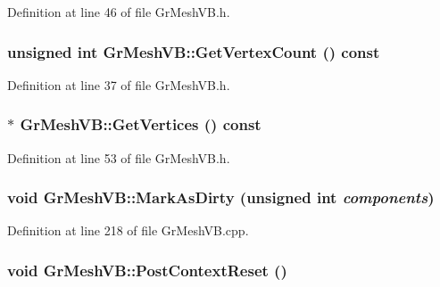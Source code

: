 Definition at line 46 of file GrMeshVB.h.\hypertarget{class_gr_mesh_v_b_c0e59bbbe7c8d4e6421733e77db0e3e1}{
\subsubsection[{GetVertexCount}]{\setlength{\rightskip}{0pt plus 5cm}unsigned int GrMeshVB::GetVertexCount () const}}
\label{class_gr_mesh_v_b_c0e59bbbe7c8d4e6421733e77db0e3e1}




Definition at line 37 of file GrMeshVB.h.\hypertarget{class_gr_mesh_v_b_3c4fc1231bfcca44bf3a4d8427d2774a}{
\subsubsection[{GetVertices}]{$\ast$ GrMeshVB::GetVertices () const}}
\label{class_gr_mesh_v_b_3c4fc1231bfcca44bf3a4d8427d2774a}




Definition at line 53 of file GrMeshVB.h.\hypertarget{class_gr_mesh_v_b_c30d2e051d289b7142588421ba53154d}{
\subsubsection[{MarkAsDirty}]{\setlength{\rightskip}{0pt plus 5cm}void GrMeshVB::MarkAsDirty (unsigned int {\em components})}}
\label{class_gr_mesh_v_b_c30d2e051d289b7142588421ba53154d}




Definition at line 218 of file GrMeshVB.cpp.\hypertarget{class_gr_mesh_v_b_63b7a4882edf12152408e75e19d4df90}{
\subsubsection[{PostContextReset}]{\setlength{\rightskip}{0pt plus 5cm}void GrMeshVB::PostContextReset ()}}
\label{class_gr_mesh_v_b_63b7a4882edf12152408e75e19d4df90}




